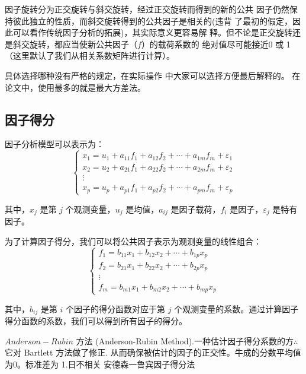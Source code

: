 \documentclass[12pt]{ctexart}
\numberwithin{equation}{section} %
\begin{document}
因子旋转分为正交旋转与斜交旋转，经过正交旋转而得到的新的公共
因子仍然保持彼此独立的性质，而斜交旋转得到的公共因子是相关的(违背
了最初的假定，因此可以看作传统因子分析的拓展)，其实际意义更容易解
释。但不论是正交旋转还是斜交旋转，都应当使新公共因子（$f$）的载荷系数的
绝对值尽可能接近0
或
1（这里默认了我们从相关系数矩阵进行计算）。


具体选择哪种没有严格的规定，在实际操作
中大家可以选择方便最后解释的。
在论文中，使用最多的就是最大方差法。


\subsection{因子得分}

因子分析模型可以表示为：
\[
\begin{cases}
x_1 = u_1 + a_{11} f_1 + a_{12} f_2 + \cdots + a_{1m} f_m + \varepsilon_1 \\
x_2 = u_2 + a_{21} f_1 + a_{22} f_2 + \cdots + a_{2m} f_m + \varepsilon_2 \\
\vdots \\
x_p = u_p + a_{p1} f_1 + a_{p2} f_2 + \cdots + a_{pm} f_m + \varepsilon_p
\end{cases}
\]

其中，\( x_j \) 是第 \( j \) 个观测变量，\( u_j \) 是均值，\( a_{ij} \) 是因子载荷，\( f_i \) 是因子，\( \varepsilon_j \) 是特有因子。

为了计算因子得分，我们可以将公共因子表示为观测变量的线性组合：
\[
\begin{cases}
f_1 = b_{11} x_1 + b_{12} x_2 + \cdots + b_{1p} x_p \\
f_2 = b_{21} x_1 + b_{22} x_2 + \cdots + b_{2p} x_p \\
\vdots \\
f_m = b_{m1} x_1 + b_{m2} x_2 + \cdots + b_{mp} x_p
\end{cases}
\]

其中，\( b_{ij} \) 是第 \( i \) 个因子的得分函数对应于第 \( j \) 个观测变量的系数。通过计算因子得分函数的系数，我们可以得到所有因子的得分。

$Anderson-Rubin$ 方法 (Anderson-Rubin Method).一种估计因子得分系数的方$\therefore$它对 Bartlett 方法做了修正.
从而确保被估计的因子的正交性。牛成的分数平均值为0。标准差为 1.日不相关 安德森一鲁宾因子得分法
\end{document}
